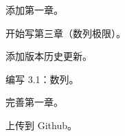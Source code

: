 \documentclass[lang=cn,10pt]{elegantbook}
\begin{document}
\begin{change}
  \item 添加第一章。
  \item 开始写第三章（数列极限）。
\end{change}

\begin{change}
  \item 添加版本历史更新。
  \item 编写 3.1：数列。
\end{change}

\begin{change}
  \item 完善第一章。
  \item 上传到 Github。
\end{change}
\end{document}
